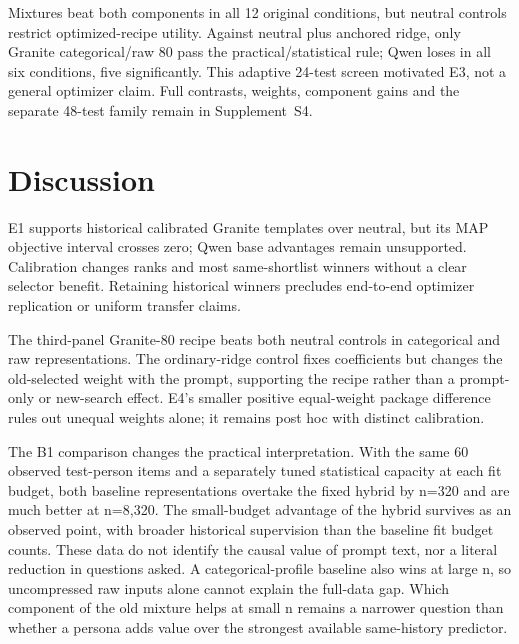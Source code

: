 \documentclass[10pt,twocolumn]{article}
\newcommand{\ArchivalApp}{Supplement~S4}
\begin{document}
Mixtures beat both components in all 12 original conditions, but neutral
controls restrict optimized-recipe utility. Against neutral plus anchored
ridge, only Granite categorical/raw 80 pass the practical/statistical rule;
Qwen loses in all six conditions, five significantly. This adaptive 24-test
screen motivated E3, not a general optimizer claim. Full contrasts, weights,
component gains and the separate 48-test family remain in \ArchivalApp.

\section{Discussion}\label{sec:discussion}
E1 supports historical calibrated Granite templates over neutral, but its MAP
objective interval crosses zero; Qwen base advantages remain unsupported.
Calibration changes ranks and most same-shortlist winners without a clear
selector benefit. Retaining historical winners precludes end-to-end optimizer
replication or uniform transfer claims.

The third-panel Granite-80 recipe beats both neutral controls in categorical
and raw representations. The ordinary-ridge control fixes coefficients but
changes the old-selected weight with the prompt, supporting the recipe rather
than a prompt-only or new-search effect. E4's smaller positive equal-weight
package difference rules out unequal weights alone; it remains post hoc with
distinct calibration.

The B1 comparison changes the practical interpretation. With the same 60
observed test-person items and a separately tuned statistical capacity at
each fit budget, both baseline representations overtake the fixed hybrid by
n=320 and are much better at n=8,320. The small-budget advantage of the
hybrid survives as an observed point, with broader historical supervision
than the baseline fit budget counts. These data do not identify the causal
value of prompt text, nor a literal reduction in questions asked. A
categorical-profile baseline also wins at large n, so uncompressed raw
inputs alone cannot explain the full-data gap. Which component of the old
mixture helps at small n remains a narrower question than whether a persona
adds value over the strongest available same-history predictor.
\end{document}
